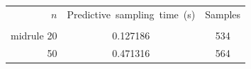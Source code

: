 \begin{tabular}{rcc}
\toprule
$n$ & Predictive~sampling~time~(s) & Samples \\ \\midrule
20 & 0.127186 & 534 \\ 
50 & 0.471316 & 564 \\ 
\bottomrule
\end{tabular}

